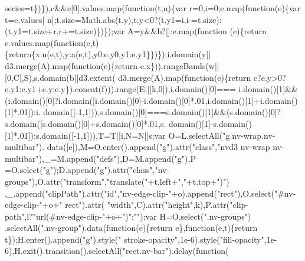 \begin{DoxyCode}
{      series=t\})\}),c&&e[0].values.map(\textcolor{keyword}{function}(t,n)\{var r=0,i=0;e.map(\textcolor{keyword}{function}(e)\{var t=e.values[
      n];t.size=Math.abs(t.y),t.y<0?(t.y1=i,i-=t.size):(t.y1=t.size+r,r+=t.size)\})\});var A=y&&b?[]:e.map(\textcolor{keyword}{function}
      (e)\{\textcolor{keywordflow}{return} e.values.map(\textcolor{keyword}{function}(e,t)\{\textcolor{keywordflow}{return}\{x:u(e,t),y:a(e,t),y0:e.y0,y1:e.y1\}\})\});i.domain(y||
      d3.merge(A).map(\textcolor{keyword}{function}(e)\{\textcolor{keywordflow}{return} e.x\})).rangeBands(w||[0,C],S),s.domain(b||d3.extent(
      d3.merge(A).map(\textcolor{keyword}{function}(e)\{\textcolor{keywordflow}{return} c?e.y>0?e.y1:e.y1+e.y:e.y\}).concat(f))).range(E||[k,0]),i.domain()[0]===
      i.domain()[1]&&(i.domain()[0]?i.domain([i.domain()[0]-i.domain()[0]*.01,i.domain()[1]+i.domain()[1]*.01]):i.
      domain([-1,1])),s.domain()[0]===s.domain()[1]&&(s.domain()[0]?s.domain([s.domain()[0]+s.domain()[0]*.01,s.
      domain()[1]-s.domain()[1]*.01]):s.domain([-1,1])),T=T||i,N=N||s;var O=L.selectAll(\textcolor{stringliteral}{"g.nv-wrap.nv-multibar"}).
      data([e]),M=O.enter().append(\textcolor{stringliteral}{"g"}).attr(\textcolor{stringliteral}{"class"},\textcolor{stringliteral}{"nvd3 nv-wrap nv-multibar"}),\_=M.append(\textcolor{stringliteral}{"defs"}),D=M.append(\textcolor{stringliteral}{"g"}),P
      =O.select(\textcolor{stringliteral}{"g"});D.append(\textcolor{stringliteral}{"g"}).attr(\textcolor{stringliteral}{"class"},\textcolor{stringliteral}{"nv-groups"}),O.attr(\textcolor{stringliteral}{"transform"},\textcolor{stringliteral}{"translate("}+t.left+\textcolor{stringliteral}{","}+t.top+\textcolor{stringliteral}{")"})
      ,\_.append(\textcolor{stringliteral}{"clipPath"}).attr(\textcolor{stringliteral}{"id"},\textcolor{stringliteral}{"nv-edge-clip-"}+o).append(\textcolor{stringliteral}{"rect"}),O.select(\textcolor{stringliteral}{"#nv-edge-clip-"}+o+\textcolor{stringliteral}{" rect"}).attr(\textcolor{stringliteral}{
      "width"},C).attr(\textcolor{stringliteral}{"height"},k),P.attr(\textcolor{stringliteral}{"clip-path"},l?\textcolor{stringliteral}{"url(#nv-edge-clip-"}+o+\textcolor{stringliteral}{")"}:\textcolor{stringliteral}{""});var H=O.select(\textcolor{stringliteral}{".nv-groups"})
      .selectAll(\textcolor{stringliteral}{".nv-group"}).data(\textcolor{keyword}{function}(e)\{\textcolor{keywordflow}{return} e\},\textcolor{keyword}{function}(e,t)\{\textcolor{keywordflow}{return} t\});H.enter().append(\textcolor{stringliteral}{"g"}).style(\textcolor{stringliteral}{"
      stroke-opacity"},1e-6).style(\textcolor{stringliteral}{"fill-opacity"},1e-6),H.exit().transition().selectAll(\textcolor{stringliteral}{"rect.nv-bar"}).delay(\textcolor{keyword}{function}(
}
\end{DoxyCode}
